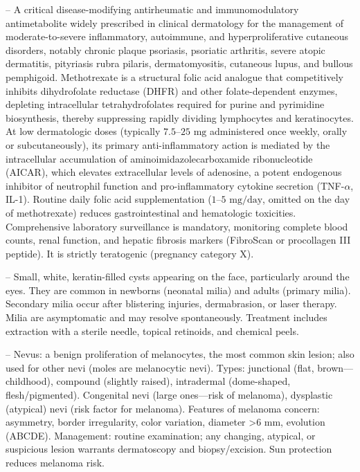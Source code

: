 -- A critical disease-modifying antirheumatic and immunomodulatory antimetabolite widely prescribed in clinical dermatology for the management of moderate-to-severe inflammatory, autoimmune, and hyperproliferative cutaneous disorders, notably chronic plaque psoriasis, psoriatic arthritis, severe atopic dermatitis, pityriasis rubra pilaris, dermatomyositis, cutaneous lupus, and bullous pemphigoid. Methotrexate is a structural folic acid analogue that competitively inhibits dihydrofolate reductase (DHFR) and other folate-dependent enzymes, depleting intracellular tetrahydrofolates required for purine and pyrimidine biosynthesis, thereby suppressing rapidly dividing lymphocytes and keratinocytes. At low dermatologic doses (typically $7.5\text{--}25\text{ mg}$ administered once weekly, orally or subcutaneously), its primary anti-inflammatory action is mediated by the intracellular accumulation of aminoimidazolecarboxamide ribonucleotide (AICAR), which elevates extracellular levels of adenosine, a potent endogenous inhibitor of neutrophil function and pro-inflammatory cytokine secretion (TNF-$\alpha$, IL-1). Routine daily folic acid supplementation ($1\text{--}5\text{ mg/day}$, omitted on the day of methotrexate) reduces gastrointestinal and hematologic toxicities. Comprehensive laboratory surveillance is mandatory, monitoring complete blood counts, renal function, and hepatic fibrosis markers (FibroScan or procollagen III peptide). It is strictly teratogenic (pregnancy category X).

-- Small, white, keratin-filled cysts appearing on the face, particularly around the eyes. They are common in newborns (neonatal milia) and adults (primary milia). Secondary milia occur after blistering injuries, dermabrasion, or laser therapy. Milia are asymptomatic and may resolve spontaneously. Treatment includes extraction with a sterile needle, topical retinoids, and chemical peels.

-- Nevus: a benign proliferation of melanocytes, the most common skin lesion; also used for other nevi (moles are melanocytic nevi). Types: junctional (flat, brown—childhood), compound (slightly raised), intradermal (dome-shaped, flesh/pigmented). Congenital nevi (large ones—risk of melanoma), dysplastic (atypical) nevi (risk factor for melanoma). Features of melanoma concern: asymmetry, border irregularity, color variation, diameter >6 mm, evolution (ABCDE). Management: routine examination; any changing, atypical, or suspicious lesion warrants dermatoscopy and biopsy/excision. Sun protection reduces melanoma risk.

